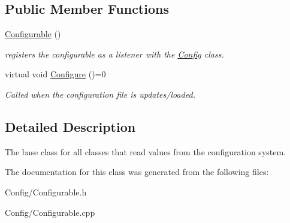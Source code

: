 \subsection*{\-Public \-Member \-Functions}
\begin{DoxyCompactItemize}
\item 
\hypertarget{class_configurable_a058f698c44e2c2fb6d4366a0fbe624f2}{
\hyperlink{class_configurable_a058f698c44e2c2fb6d4366a0fbe624f2}{\-Configurable} ()}
\label{class_configurable_a058f698c44e2c2fb6d4366a0fbe624f2}

\begin{DoxyCompactList}\small\item\em registers the configurable as a listener with the \hyperlink{class_config}{\-Config} class. \end{DoxyCompactList}\item 
\hypertarget{class_configurable_a951fdca310cfb5e2090ca10734a181e1}{
virtual void \hyperlink{class_configurable_a951fdca310cfb5e2090ca10734a181e1}{\-Configure} ()=0}
\label{class_configurable_a951fdca310cfb5e2090ca10734a181e1}

\begin{DoxyCompactList}\small\item\em \-Called when the configuration file is updates/loaded. \end{DoxyCompactList}\end{DoxyCompactItemize}


\subsection{\-Detailed \-Description}
\-The base class for all classes that read values from the configuration system. 

\-The documentation for this class was generated from the following files\-:\begin{DoxyCompactItemize}
\item 
\-Config/\-Configurable.\-h\item 
\-Config/\-Configurable.\-cpp\end{DoxyCompactItemize}
